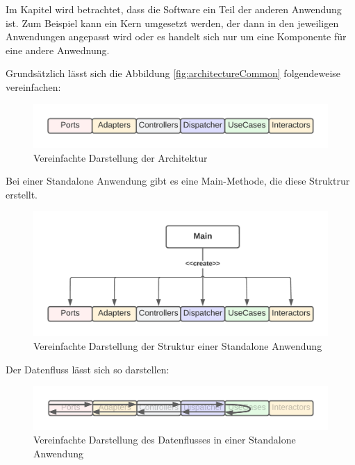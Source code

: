 Im Kapitel wird betrachtet, dass die Software ein Teil der anderen Anwendung ist.
Zum Beispiel kann ein Kern umgesetzt werden, der dann in den jeweiligen Anwendungen angepasst wird 
oder es handelt sich nur um eine Komponente für eine andere Anwednung.

Grundsätzlich lässt sich die Abbildung \ref{fig:architectureCommon} folgendeweise vereinfachen:
\begin{figure}[H]
    \centering
    \includegraphics[width=1\textwidth]{./images/SimpliedArchitecture.png}
    \caption{Vereinfachte Darstellung der Architektur}
    \label{fig:SimpliedArchitecture}
\end{figure}

Bei einer Standalone Anwendung gibt es eine Main-Methode, die diese Struktrur erstellt.
\begin{figure}[H]
    \centering
    \includegraphics[width=1\textwidth]{./images/Architecture as Standalone.png}
    \caption{Vereinfachte Darstellung der Struktur einer Standalone Anwendung}
    \label{fig:SimpliedArchitectureAsStandalone}
\end{figure}

Der Datenfluss lässt sich so darstellen:
\begin{figure}[H]
    \centering
    \includegraphics[width=1\textwidth]{./images/Dataflow.png}
    \caption{Vereinfachte Darstellung des Datenflusses in einer Standalone Anwendung}
    \label{fig:SimpliedArchitectureDataflow}
\end{figure}

